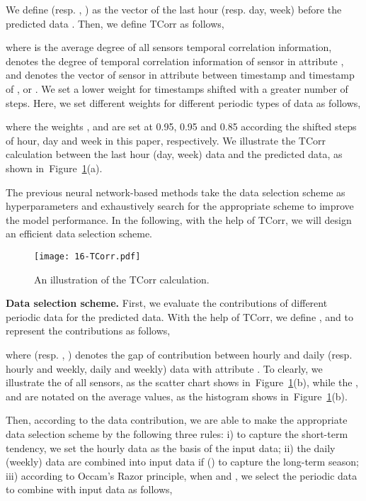 \documentclass[sn-mathphys,iicol]{sn-jnl}
\newcommand\figref[1]{Figure~\ref{#1}}
\theoremstyle{thmstyleone}\newtheorem{theorem}{Theorem}\newtheorem{proposition}[theorem]{Proposition}
\theoremstyle{thmstyletwo}\newtheorem{example}{Example}\newtheorem{remark}{Remark}
\theoremstyle{thmstylethree}\newtheorem{definition}{Definition}
\begin{document}
We define  (resp. , ) as the vector of the last hour (resp. day, week) before the predicted data . Then, we define TCorr as follows,

where  is the average degree of all sensors temporal correlation information,  denotes the degree of temporal correlation information of sensor  in attribute , and  denotes the vector of sensor  in attribute  between timestamp  and timestamp  of ,  or . We set a lower weight for timestamps shifted with a greater number of steps. Here, we set different weights for different periodic types of data as follows,

where the weights ,  and  are set at 0.95, 0.95 and 0.85 according the shifted steps of hour, day and week in this paper, respectively. We illustrate the TCorr calculation between the last hour (day, week) data and the predicted data, as shown in~\figref{fig:TCorr}(a). 

The previous neural network-based methods take the data selection scheme as hyperparameters and exhaustively search for the appropriate scheme to improve the model performance. In the following, with the help of TCorr, we will design an efficient data selection scheme.

\begin{figure}[h]
\centering
\texttt{[image: 16-TCorr.pdf]}
\caption{An illustration of the TCorr calculation.}
\label{fig:TCorr}
\end{figure}





\textbf{Data selection scheme.} First, we evaluate the contributions of different periodic data for the predicted data. With the help of TCorr, we define ,  and  to represent the contributions as follows, 

where  (resp. , ) denotes the gap of contribution between hourly and daily (resp. hourly and weekly, daily and weekly) data with attribute . To clearly, we illustrate the  of all sensors, as the scatter chart shows in~\figref{fig:TCorr}(b), while the ,  and  are notated on the average values, as the histogram shows in~\figref{fig:TCorr}(b).




Then, according to the data contribution, we are able to make the appropriate data selection scheme by the following three rules: i) to capture the short-term tendency, we set the hourly data as the basis of the input data; ii) the daily (weekly) data are combined into input data if  () to capture the long-term season; iii) according to Occam's Razor principle, when  and , we select the periodic data to combine with input data as follows,
\end{document}
